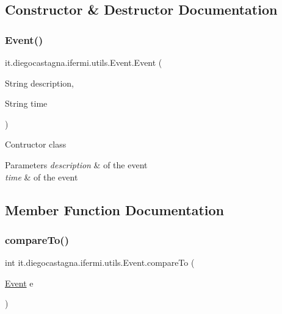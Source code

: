 \subsection{Constructor \& Destructor Documentation}
\mbox{\label{classit_1_1diegocastagna_1_1ifermi_1_1utils_1_1_event_a6a5971925ddbbd3de1dd3fdd16013f0a}} 
\subsubsection{\texorpdfstring{Event()}{Event()}}
{\footnotesize\ttfamily it.\+diegocastagna.\+ifermi.\+utils.\+Event.\+Event (\begin{DoxyParamCaption}\item[{String}]{description,  }\item[{String}]{time }\end{DoxyParamCaption})\hspace{0.3cm}{\ttfamily [inline]}}

Contructor class 
\begin{DoxyParams}{Parameters}
{\em description} & of the event \\
\hline
{\em time} & of the event \\
\hline
\end{DoxyParams}


\subsection{Member Function Documentation}
\mbox{\label{classit_1_1diegocastagna_1_1ifermi_1_1utils_1_1_event_ac8673f7826033944f7b76b8e43fe480e}} 
\subsubsection{\texorpdfstring{compareTo()}{compareTo()}}
{\footnotesize\ttfamily int it.\+diegocastagna.\+ifermi.\+utils.\+Event.\+compare\+To (\begin{DoxyParamCaption}\item[{\mbox{\hyperlink{classit_1_1diegocastagna_1_1ifermi_1_1utils_1_1_event}{Event}}}]{e }\end{DoxyParamCaption})\hspace{0.3cm}{\ttfamily [inline]}}

